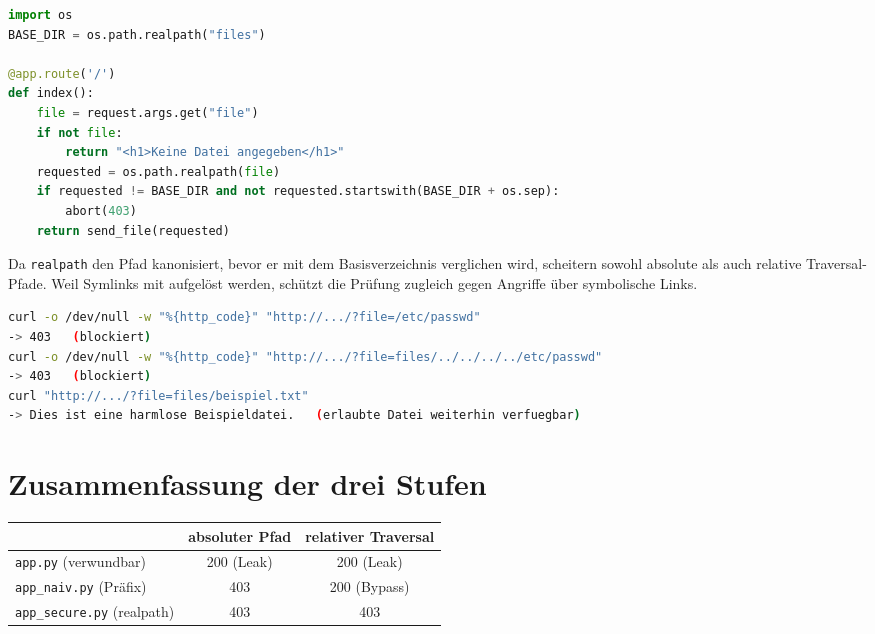 \documentclass[
	fontsize=12pt,
	paper=a4,
	numbers=noenddot,
	listof=totoc,
	listof=entryprefix,
	listof=nochaptergap,
	bibliography=totoc,
	parskip=half,
	openany
]{scrbook}
\begin{document}
\begin{lstlisting}[language=Python]
import os
BASE_DIR = os.path.realpath("files")

@app.route('/')
def index():
    file = request.args.get("file")
    if not file:
        return "<h1>Keine Datei angegeben</h1>"
    requested = os.path.realpath(file)
    if requested != BASE_DIR and not requested.startswith(BASE_DIR + os.sep):
        abort(403)
    return send_file(requested)
\end{lstlisting}

Da \texttt{realpath} den Pfad kanonisiert, bevor er mit dem Basisverzeichnis
verglichen wird, scheitern sowohl absolute als auch relative Traversal-Pfade.
Weil Symlinks mit aufgelöst werden, schützt die Prüfung zugleich gegen Angriffe
über symbolische Links.

\begin{lstlisting}[language=bash]
curl -o /dev/null -w "%{http_code}" "http://.../?file=/etc/passwd"
-> 403   (blockiert)
curl -o /dev/null -w "%{http_code}" "http://.../?file=files/../../../../etc/passwd"
-> 403   (blockiert)
curl "http://.../?file=files/beispiel.txt"
-> Dies ist eine harmlose Beispieldatei.   (erlaubte Datei weiterhin verfuegbar)
\end{lstlisting}

\section*{Zusammenfassung der drei Stufen}

\begin{center}
\begin{tabular}{lcc}
\toprule
 & absoluter Pfad & relativer Traversal \\
\midrule
\texttt{app.py} (verwundbar) & 200 (Leak) & 200 (Leak) \\
\texttt{app\_naiv.py} (Präfix) & 403 & 200 (Bypass) \\
\texttt{app\_secure.py} (realpath) & 403 & 403 \\
\bottomrule
\end{tabular}
\end{center}
\end{document}
